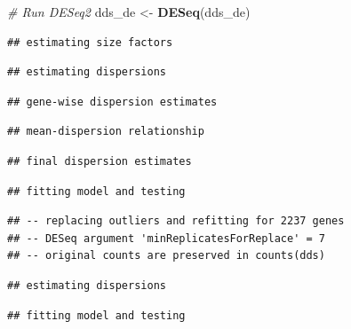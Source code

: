 \documentclass[
]{article}
\newenvironment{Shaded}{\begin{snugshade}}{\end{snugshade}}
\newcommand{\CommentTok}[1]{\textcolor[rgb]{0.56,0.35,0.01}{\textit{#1}}}
\newcommand{\FunctionTok}[1]{\textcolor[rgb]{0.13,0.29,0.53}{\textbf{#1}}}
\newcommand{\NormalTok}[1]{#1}
\newcommand{\OtherTok}[1]{\textcolor[rgb]{0.56,0.35,0.01}{#1}}
\begin{document}
\begin{Shaded}
\begin{Highlighting}[]
\CommentTok{\# Run DESeq2}
\NormalTok{dds\_de }\OtherTok{\textless{}{-}} \FunctionTok{DESeq}\NormalTok{(dds\_de)}
\end{Highlighting}
\end{Shaded}

\begin{verbatim}
## estimating size factors
\end{verbatim}

\begin{verbatim}
## estimating dispersions
\end{verbatim}

\begin{verbatim}
## gene-wise dispersion estimates
\end{verbatim}

\begin{verbatim}
## mean-dispersion relationship
\end{verbatim}

\begin{verbatim}
## final dispersion estimates
\end{verbatim}

\begin{verbatim}
## fitting model and testing
\end{verbatim}

\begin{verbatim}
## -- replacing outliers and refitting for 2237 genes
## -- DESeq argument 'minReplicatesForReplace' = 7 
## -- original counts are preserved in counts(dds)
\end{verbatim}

\begin{verbatim}
## estimating dispersions
\end{verbatim}

\begin{verbatim}
## fitting model and testing
\end{verbatim}
\end{document}
